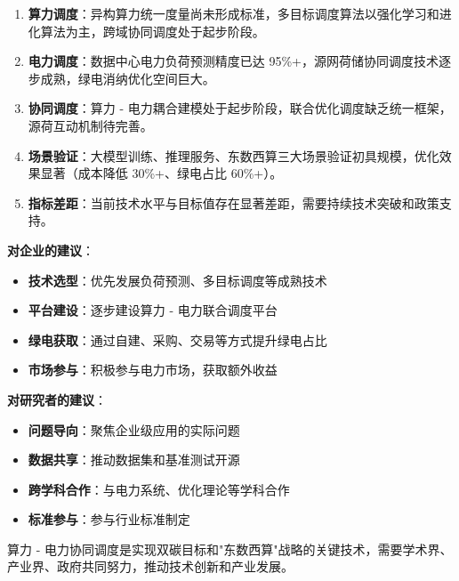 \documentclass[12pt,a4paper]{article}
\begin{document}
\begin{enumerate}
    \item \textbf{算力调度}：异构算力统一度量尚未形成标准，多目标调度算法以强化学习和进化算法为主，跨域协同调度处于起步阶段。
    
    \item \textbf{电力调度}：数据中心电力负荷预测精度已达 95\%+，源网荷储协同调度技术逐步成熟，绿电消纳优化空间巨大。
    
    \item \textbf{协同调度}：算力 - 电力耦合建模处于起步阶段，联合优化调度缺乏统一框架，源荷互动机制待完善。
    
    \item \textbf{场景验证}：大模型训练、推理服务、东数西算三大场景验证初具规模，优化效果显著（成本降低 30\%+、绿电占比 60\%+）。
    
    \item \textbf{指标差距}：当前技术水平与目标值存在显著差距，需要持续技术突破和政策支持。
\end{enumerate}

\textbf{对企业的建议}：
\begin{itemize}
    \item \textbf{技术选型}：优先发展负荷预测、多目标调度等成熟技术
    \item \textbf{平台建设}：逐步建设算力 - 电力联合调度平台
    \item \textbf{绿电获取}：通过自建、采购、交易等方式提升绿电占比
    \item \textbf{市场参与}：积极参与电力市场，获取额外收益
\end{itemize}

\textbf{对研究者的建议}：
\begin{itemize}
    \item \textbf{问题导向}：聚焦企业级应用的实际问题
    \item \textbf{数据共享}：推动数据集和基准测试开源
    \item \textbf{跨学科合作}：与电力系统、优化理论等学科合作
    \item \textbf{标准参与}：参与行业标准制定
\end{itemize}

算力 - 电力协同调度是实现双碳目标和"东数西算"战略的关键技术，需要学术界、产业界、政府共同努力，推动技术创新和产业发展。

\printbibliography
\end{document}
